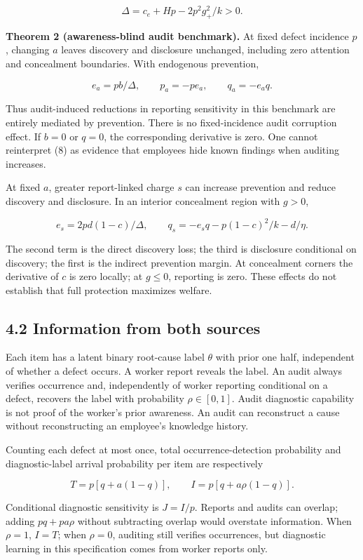 \documentclass[
  11pt,
]{article}
\begin{document}
\[\Delta=c_e+Hp-2p^2g_+^2/k>0.\]

\textbf{Theorem 2 (awareness-blind audit benchmark).} At fixed defect
incidence \(p\), changing \(a\) leaves discovery and disclosure
unchanged, including zero attention and concealment boundaries. With
endogenous prevention,

\[e_a=pb/\Delta,\qquad p_a=-pe_a,\qquad q_a=-e_aq. \tag{8}\]

Thus audit-induced reductions in reporting sensitivity in this benchmark
are entirely mediated by prevention. There is no fixed-incidence audit
corruption effect. If \(b=0\) or \(q=0\), the corresponding derivative
is zero. One cannot reinterpret (8) as evidence that employees hide
known findings when auditing increases.

At fixed \(a\), greater report-linked charge \(s\) can increase
prevention and reduce discovery and disclosure. In an interior
concealment region with \(g>0\),

\[e_s=2pd(1-c)/\Delta,\qquad
 q_s=-e_sq-p(1-c)^2/k-d/\eta. \tag{9}\]

The second term is the direct discovery loss; the third is disclosure
conditional on discovery; the first is the indirect prevention margin.
At concealment corners the derivative of \(c\) is zero locally; at
\(g\leq0\), reporting is zero. These effects do not establish that full
protection maximizes welfare.

\subsection{4.2 Information from both
sources}\label{information-from-both-sources}

Each item has a latent binary root-cause label \(\theta\) with prior one
half, independent of whether a defect occurs. A worker report reveals
the label. An audit always verifies occurrence and, independently of
worker reporting conditional on a defect, recovers the label with
probability \(\rho\in[0,1]\). Audit diagnostic capability is not proof
of the worker's prior awareness. An audit can reconstruct a cause
without reconstructing an employee's knowledge history.

Counting each defect at most once, total occurrence-detection
probability and diagnostic-label arrival probability per item are
respectively

\[T=p[q+a(1-q)],\qquad
 I=p[q+a\rho(1-q)]. \tag{10}\]

Conditional diagnostic sensitivity is \(J=I/p\). Reports and audits can
overlap; adding \(pq+pa\rho\) without subtracting overlap would
overstate information. When \(\rho=1\), \(I=T\); when \(\rho=0\),
auditing still verifies occurrences, but diagnostic learning in this
specification comes from worker reports only.
\end{document}
